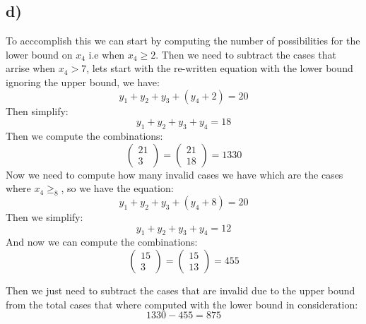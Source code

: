 \documentclass{article}
\begin{document}
\subsection*{d)}
To acccomplish this we can start by computing the number of possibilities for the lower bound on $x_{4}$ i.e when $x_{4}\geq 2$. Then we need to subtract the cases that arrise when $x_{4}>7$, lets start with the re-written equation with the lower bound ignoring the upper bound, we have: 
$$y_{1}+y_{2}+y_{3}+(y_{4}+2)=20$$
Then simplify: 
$$y_{1}+y_{2}+y_{3}+y_{4}=18$$
Then we compute the combinations: $$\begin{pmatrix}
    21\\3
\end{pmatrix}=\begin{pmatrix}
    21\\18
\end{pmatrix}=1330$$
Now we need to compute how many invalid cases we have which are the cases where $x_{4}\geq_{8}$, so we have the equation: 
$$y_{1}+y_{2}+y_{3}+(y_{4}+8)=20$$
Then we simplify: $$y_{1}+y_{2}+y_{3}+y_{4}=12$$
And now we can compute the combinations: $$\begin{pmatrix}
    15\\3
\end{pmatrix}=\begin{pmatrix}
    15\\13
\end{pmatrix}=455$$

Then we just need to subtract the cases that are invalid due to the upper bound from the total cases that where computed with the lower bound in consideration: $$1330-455=875$$
\newpage
\end{document}
